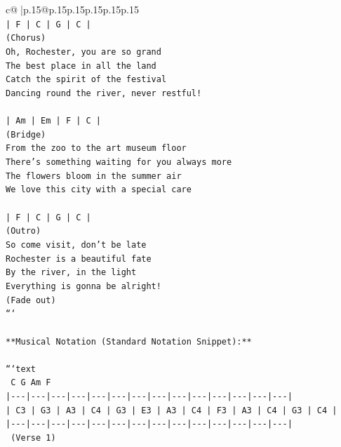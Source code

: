 \documentclass{article}
\begin{document}
{\begin{supertabular}{c@{$\;$}|p{.15\linewidth}@{}p{.15\linewidth}p{.15\linewidth}p{.15\linewidth}p{.15\linewidth}p{.15\linewidth}}
{{{\\ 
\texttt{| F   | C   | G   | C   |} \\
\texttt{(Chorus)} \\
\texttt{Oh, Rochester, you are so grand} \\
\texttt{The best place in all the land} \\
\texttt{Catch the spirit of the festival} \\
\texttt{Dancing round the river, never restful!} \\
\\ 
\texttt{| Am  | Em  | F   | C   |} \\
\texttt{(Bridge)} \\
\texttt{From the zoo to the art museum floor} \\
\texttt{There's something waiting for you always more} \\
\texttt{The flowers bloom in the summer air} \\
\texttt{We love this city with a special care} \\
\\ 
\texttt{| F   | C   | G   | C   |} \\
\texttt{(Outro)} \\
\texttt{So come visit, don't be late} \\
\texttt{Rochester is a beautiful fate} \\
\texttt{By the river, in the light} \\
\texttt{Everything is gonna be alright!} \\
\texttt{(Fade out)} \\
\texttt{```} \\
\\ 
\texttt{**Musical Notation (Standard Notation Snippet):**} \\
\\ 
\texttt{```text} \\
\texttt{      C          G          Am         F} \\
\texttt{|{-}{-}{-}|{-}{-}{-}|{-}{-}{-}|{-}{-}{-}|{-}{-}{-}|{-}{-}{-}|{-}{-}{-}|{-}{-}{-}|{-}{-}{-}|{-}{-}{-}|{-}{-}{-}|{-}{-}{-}|{-}{-}{-}|{-}{-}{-}|} \\
\texttt{| C3 | G3 | A3 | C4 | G3 | E3 | A3 | C4 | F3 | A3 | C4 | G3 | C4 |} \\
\texttt{|{-}{-}{-}|{-}{-}{-}|{-}{-}{-}|{-}{-}{-}|{-}{-}{-}|{-}{-}{-}|{-}{-}{-}|{-}{-}{-}|{-}{-}{-}|{-}{-}{-}|{-}{-}{-}|{-}{-}{-}|{-}{-}{-}|{-}{-}{-}|} \\
\texttt{      (Verse 1)} \\
}}}
\end{supertabular}}
\end{document}
